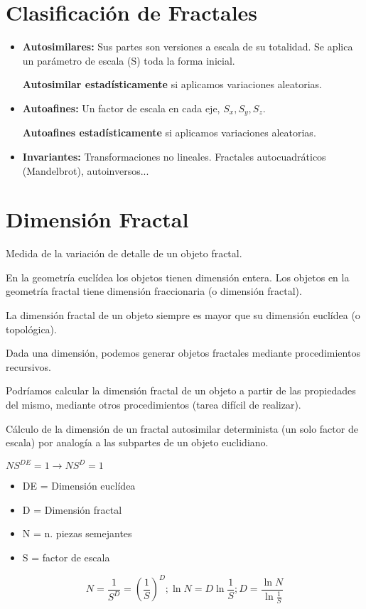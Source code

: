 \section{Clasificación de Fractales}
\begin{itemize}
    \item \textbf{Autosimilares:} Sus partes son versiones a escala de su totalidad. Se aplica un parámetro de escala (S) toda la forma inicial.
    
    \textbf{Autosimilar estadísticamente} si aplicamos variaciones aleatorias.
    \item \textbf{Autoafines:} Un factor de escala en cada eje, $S_x, S_y, S_z$.
    
    \textbf{Autoafines estadísticamente} si aplicamos variaciones aleatorias.
    \item \textbf{Invariantes:} Transformaciones no lineales. Fractales autocuadráticos (Mandelbrot), autoinversos...
\end{itemize}

\section{Dimensión Fractal}
Medida de la variación de detalle de un objeto fractal.

En la geometría euclídea los objetos tienen dimensión entera. Los objetos en la geometría fractal tiene dimensión fraccionaria (o dimensión fractal).

La dimensión fractal de un objeto siempre es mayor que su dimensión euclídea (o topológica).

Dada una dimensión, podemos generar objetos fractales mediante procedimientos recursivos.

Podríamos calcular la dimensión fractal de un objeto a partir de las propiedades del mismo, mediante otros procedimientos (tarea difícil de realizar).

Cálculo de la dimensión de un fractal autosimilar determinista (un solo factor de escala) por analogía a las subpartes de un objeto euclidiano.

$NS^{DE}=1 \rightarrow NS^{D}=1$
\begin{itemize}
    \item DE = Dimensión euclídea
    \item D = Dimensión fractal
    \item N = n. piezas semejantes
    \item S = factor de escala
\end{itemize}
$$N=\frac{1}{S^D}=\left(\frac{1}{S}\right)^D; \ln N = D \ln \frac{1}{S}; D = \frac{\ln N}{\ln \frac{1}{S}}$$